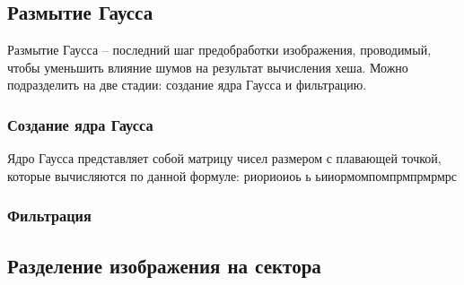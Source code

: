 \subsection{Размытие Гаусса}
Размытие Гаусса -- последний шаг предобработки изображения, проводимый, чтобы
уменьшить влияние шумов на результат вычисления хеша. Можно подразделить на
две стадии: создание ядра Гаусса и фильтрацию.

\subsubsection{Создание ядра Гаусса}

Ядро Гаусса представляет собой матрицу чисел размером  с плавающей точкой,
которые вычисляются по данной формуле: риориоиоь ь ьииормомпомпрмпрмрмрс



\subsubsection{Фильтрация}


\subsection*{Разделение изображения на сектора}

